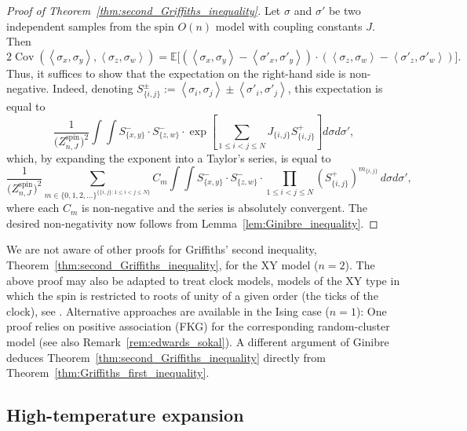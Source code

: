 \documentclass[12pt,reqno]{article}
\def\E{\mathbb{E}}
\DeclareMathOperator{\Cov}{Cov}
\begin{document}
\begin{proof}[Proof of Theorem~\ref{thm:second_Griffiths_inequality}]
	Let $\sigma$ and $\sigma'$ be two independent samples from the spin $O(n)$ model with coupling constants $J$. Then
\[ 2 \Cov\left(\left\langle\sigma_x,\sigma_y\right\rangle, \left\langle\sigma_z,\sigma_w\right\rangle\right) = \E\big[ \left(\left\langle\sigma_x,\sigma_y\right\rangle - \left\langle\sigma'_x,\sigma'_y\right\rangle\right)\cdot\left(\left\langle\sigma_z,\sigma_w\right\rangle-\left\langle\sigma'_z,\sigma'_w\right\rangle\right)\big] .\]
Thus, it suffices to show that the expectation on the right-hand side is non-negative.
Indeed, denoting $S^{\pm}_{\{i,j\}} := \left\langle\sigma_i,\sigma_j\right\rangle \pm \left\langle\sigma'_i,\sigma'_j\right\rangle$, this expectation is equal to
\[ \frac{1}{\big(Z^{\text{spin}}_{n,J}\big)^2} \int \int S^-_{\{x,y\}} \cdot S^-_{\{z,w\}} \cdot \exp \left[\sum_{1\le i<j\le N} J_{\{i,j\}} S^+_{\{i,j\}}\right] d\sigma d\sigma' ,\]
which, by expanding the exponent into a Taylor's series, is equal to
\[ \frac{1}{\big(Z^{\text{spin}}_{n,J}\big)^2} \sum_{m \in \{0,1,2,\dots\}^{\{\{i,j\}:1 \le i<j \le N\}}} C_m \int \int S^-_{\{x,y\}} \cdot S^-_{\{z,w\}} \cdot \prod_{1\le i<j\le N} \left(S^+_{\{i,j\}}\right)^{m_{\{i,j\}}} \, d\sigma d\sigma' ,\]
where each $C_m$ is non-negative and the series is absolutely convergent. The desired non-negativity now follows from Lemma~\ref{lem:Ginibre_inequality}.
\end{proof}

We are not aware of other proofs for Griffiths' second inequality, Theorem~\ref{thm:second_Griffiths_inequality}, for the XY model ($n=2$). The above proof may also be adapted to treat clock models, models of the XY type in which the spin is restricted to roots of unity of a given order (the ticks of the clock), see \cite{Gin70}. Alternative approaches are available in the Ising case ($n=1$): One proof relies on positive association (FKG) for the corresponding random-cluster model (see also Remark~\ref{rem:edwards_sokal}). A different argument of Ginibre~\cite{ginibre1969simple} deduces Theorem~\ref{thm:second_Griffiths_inequality} directly from Theorem~\ref{thm:Griffiths_first_inequality}.



\subsection{High-temperature expansion}\label{sec:high-temperature_expansion}
\end{document}
